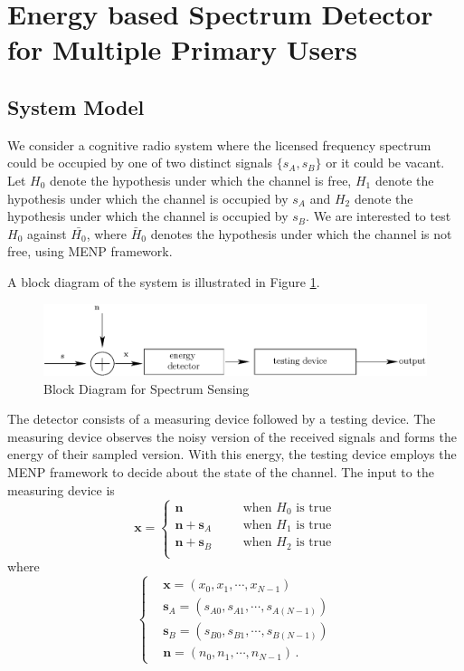 \section{Energy based Spectrum Detector for Multiple Primary Users}
\subsection{System Model}
We consider a cognitive radio system where the licensed frequency spectrum could be occupied by one of two distinct signals $\{s_A, s_B\}$ or it could be vacant. Let $H_0$ denote the hypothesis under which the channel is free, ${H}_1$ denote the hypothesis under which the channel is occupied by $s_A$ and ${H}_2$ denote the hypothesis under which the channel is occupied by $s_B$. We are interested to test $H_0$ against $\bar{{H}_0}$, where $\bar{H}_0$ denotes the hypothesis under which the channel is not free, using MENP framework.

A block diagram of the system is illustrated in Figure \ref{pic: block diagram}.

\begin{figure}[!hbp]
\centering
\includegraphics[width = \textwidth]{4/fig4.eps}
\caption{Block Diagram for Spectrum Sensing}
\label{pic: block diagram}
\end{figure}

The detector consists of a measuring device followed by a testing device. 
The measuring device observes the noisy version of the received signals and forms the energy of their sampled version.
With this energy, the testing device employs the MENP framework to decide about the state of the channel.
The input to the measuring device is 
\begin{equation}
  \mathbf{x} = \begin{cases}
	\mathbf{n}\;\;\;\;\;\;&\text{when $H_0$ is true}\\
	\mathbf{n}+\mathbf{s}_A\;\;\;\;\;\;&\text{when $H_1$ is true}\\
	\mathbf{n}+\mathbf{s}_B\;\;\;\;\;\;&\text{when $H_2$ is true}\\
  \end{cases}
  \label{equ:1222n0}
\end{equation}
where 
\begin{equation}
  \begin{cases}
	&\mathbf{x} = (x_0, x_1, \cdots, x_{N-1})\\
	&\mathbf{s}_A = (s_{A0}, s_{A1}, \cdots, s_{A(N-1)})\\
	&\mathbf{s}_B = (s_{B0}, s_{B1}, \cdots, s_{B(N-1)})\\
	&\mathbf{n} = (n_{0}, n_{1}, \cdots, n_{N-1})\,.
  \end{cases}
  \label{1222n1}
\end{equation}

